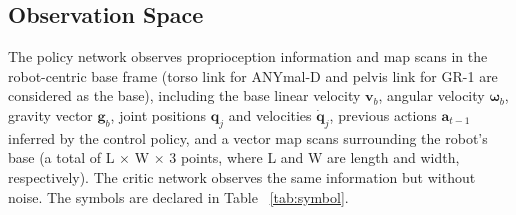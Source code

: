 \documentclass[9pt,twocolumn,twoside]{osajnl}
\begin{document}




\subsection*{Observation Space}
The policy network observes proprioception information and map scans in the robot-centric base frame (torso link for ANYmal-D and pelvis link for GR-1 are considered as the base), including the base linear velocity $\boldsymbol{v}_{b}$, angular velocity $\boldsymbol{\omega}_{b}$, gravity vector $\mathbf{g}_{b}$, joint positions $\mathbf{q}_j$ and velocities $\mathbf{\dot{q}}_j$, previous actions $\mathbf{a}_{t-1}$ inferred by the control policy, and a vector map scans surrounding the robot's base (a total of L $\times$ W $\times$ 3 points, where L and W are length and width, respectively). The critic network observes the same information but without noise. The symbols are declared in Table ~\ref{tab:symbol}.\\
\end{document}
